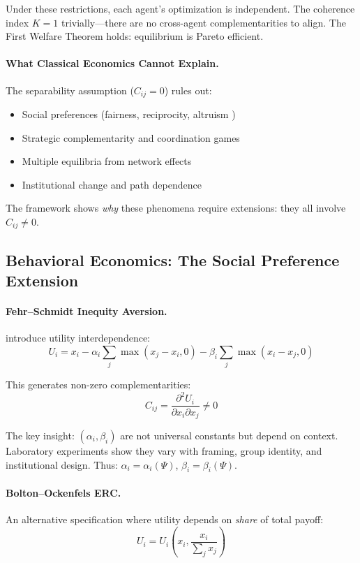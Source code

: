 \documentclass[12pt,a4paper]{article}
\begin{document}
Under these restrictions, each agent's optimization is independent.
The coherence index $K = 1$ trivially---there are no cross-agent complementarities to align.
The First Welfare Theorem holds: equilibrium is Pareto efficient.

\paragraph{What Classical Economics Cannot Explain.}
The separability assumption ($C_{ij} = 0$) rules out:
\begin{itemize}
  \item Social preferences (fairness, reciprocity, altruism \citep{fehrfischbacher2003})
  \item Strategic complementarity and coordination games
  \item Multiple equilibria from network effects
  \item Institutional change and path dependence
\end{itemize}

The framework shows \emph{why} these phenomena require extensions:
they all involve $C_{ij} \neq 0$.

\subsection{Behavioral Economics: The Social Preference Extension}

\paragraph{Fehr--Schmidt Inequity Aversion.}
\citet{fehrschmidt} introduce utility interdependence:
\begin{equation}
  U_i = x_i - \alpha_i \sum_{j} \max(x_j - x_i, 0) - \beta_i \sum_{j} \max(x_i - x_j, 0)
\end{equation}

This generates non-zero complementarities:
\begin{equation}
  C_{ij} = \frac{\partial^2 U_i}{\partial x_i \partial x_j} \neq 0
\end{equation}

The key insight: $(\alpha_i, \beta_i)$ are not universal constants but depend on context.
Laboratory experiments show they vary with framing, group identity, and institutional design.
Thus: $\alpha_i = \alpha_i(\Psi)$, $\beta_i = \beta_i(\Psi)$.

\paragraph{Bolton--Ockenfels ERC.}
An alternative specification where utility depends on \emph{share} of total payoff:
\begin{equation}
  U_i = U_i\left(x_i, \frac{x_i}{\sum_j x_j}\right)
\end{equation}
\end{document}

